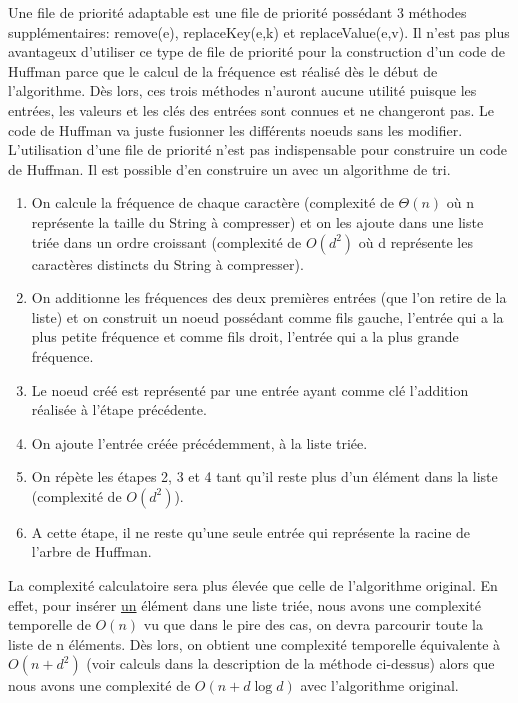 \documentclass[10pt,a4paper]{article}
\begin{document}
Une file de priorité adaptable est une file de priorité possédant 3 méthodes supplémentaires: remove(e), replaceKey(e,k) et replaceValue(e,v). Il n'est pas plus avantageux d'utiliser ce type de file de priorité pour la construction d'un code de Huffman parce que le calcul de la fréquence est réalisé dès le début de l'algorithme. Dès lors, ces trois méthodes n'auront aucune utilité puisque les entrées, les valeurs et les clés des entrées sont connues et ne changeront pas. Le code de Huffman va juste fusionner les différents noeuds sans les modifier.\\

L’utilisation d’une file de priorité n’est pas indispensable pour construire un code de Huffman. Il est possible d'en construire un avec un algorithme de tri. 

\begin{enumerate}
\item On calcule la fréquence de chaque caractère (complexité de $\Theta(n)$ où n représente la taille du String à compresser) et on les ajoute dans une liste triée dans un ordre croissant (complexité de $O(d^{2})$ où d représente les caractères distincts du String à compresser).
\item On additionne les fréquences des deux premières entrées (que l'on retire de la liste) et on construit un noeud possédant comme fils gauche, l'entrée qui a la plus petite fréquence et comme fils droit, l'entrée qui a la plus grande fréquence.
\item Le noeud créé est représenté par une entrée ayant comme clé l'addition réalisée à l'étape précédente. 
\item On ajoute l'entrée créée précédemment, à la liste triée.
\item On répète les étapes 2, 3 et 4 tant qu'il reste plus d'un élément dans la liste (complexité de $O(d^{2})$). 
\item A cette étape, il ne reste qu'une seule entrée qui représente la racine de l'arbre de Huffman.
\end{enumerate}

La complexité calculatoire sera plus élevée que celle de l'algorithme original. En effet, pour insérer \underline{un} élément dans une liste triée, nous avons une complexité temporelle de $O(n)$ vu que dans le pire des cas, on devra parcourir toute la liste de n éléments. Dès lors, on obtient une complexité temporelle équivalente à $O(n + d^2)$ (voir calculs dans la description de la méthode ci-dessus) alors que nous avons une complexité de $O(n+d\log d)$ avec l'algorithme original.
\end{document}
